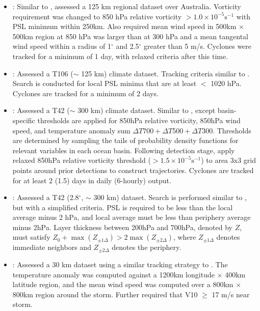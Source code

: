\documentclass[gmdd, hvmath, online]{copernicus_discussions}
\begin{document}
\begin{itemize}
\item \cite{nguyen2001interannual}:  Similar to \cite{walsh1997tropical}, assessed a 125 km regional dataset over Australia.  Vorticity requirement was changed to 850 hPa relative vorticity $> 1.0 \times 10^{-5} \mbox{s}^{-1}$ with PSL minimum within 250km.  Also required mean wind speed in 500km $\times$ 500km region at 850 hPa was larger than at 300 hPa and a mean tangental wind speed within a radius of 1$^\circ$ and 2.5$^\circ$ greater than 5 m/s.  Cyclones were tracked for a minimum of 1 day, with relaxed criteria after this time.

\item \cite{sugi2002influence}:  Assessed a T106 ($\sim$ 125 km) climate dataset.  Tracking criteria similar to \cite{bengtsson1995hurricane}.  Search is conducted for local PSL minima that are at least $<$ 1020 hPa.  Cyclones are tracked for a minimum of 2 days.

\item \cite{camargo2002improving}:  Assessed a T42 ($\sim$ 300 km) climate dataset.  Similar to \cite{bengtsson1995hurricane, bengtsson1996will}, except basin-specific thresholds are applied for 850hPa relative vorticity, 850hPa wind speed, and temperature anomaly sum $\Delta T700+ \Delta T500+ \Delta T300$. Thresholds are determined by sampling the tails of probability density functions for relevant variables in each ocean basin. Following detection stage, apply relaxed 850hPa relative vorticity threshold ($> 1.5 \times 10^{-5} \mbox{s}^{-1}$) to area 3x3 grid points around prior detections to construct trajectories. Cyclones are tracked for at least 2 (1.5) days in daily (6-hourly) output. 

\item \cite{tsutsui2002implications}:  Assessed a T42 (2.8$^\circ$, $\sim$ 300 km) dataset.  Search is performed similar to \cite{tsutsui1996simulated}, but with a simplified criteria.  PSL is required to be less than the local average minus 2 hPa, and local average must be less than periphery average minus 2hPa.  Layer thickness between 200hPa and 700hPa, denoted by $Z$, must satisfy $Z_0 + \max(Z_{\pm 1 \Delta}) > 2 \max(Z_{\pm 2 \Delta})$, where $Z_{\pm 1 \Delta}$ denotes immediate neighbors and $Z_{\pm 2 \Delta}$ denotes the periphery.

\item \cite{walsh2004fine}:  Assessed a 30 km dataset using a similar tracking strategy to \cite{nguyen2001interannual}.  The temperature anomaly was computed against a 1200km longitude $\times$ 400km latitude region, and the mean wind speed was computed over a 800km $\times$ 800km region around the storm.  Further required that V10 $\geq$ 17 m/s near storm.


\end{itemize}
\end{document}
